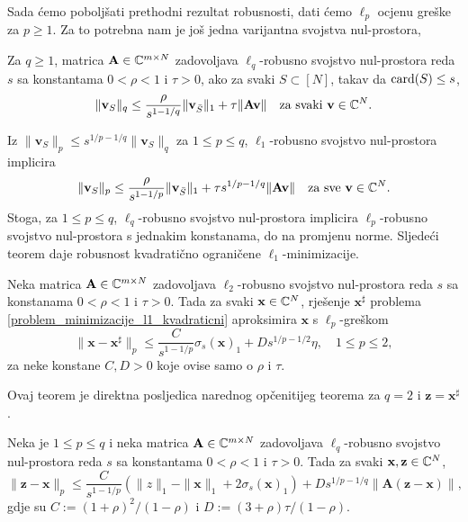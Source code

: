\documentclass[a4paper,twoside,12pt]{memoir} %
\newcommand{\vect}[1]{\mathbf{#1}}
\renewcommand{\vec}{\vect}
\newcommand{\card}{\text{\normalfont{card}}}
\newcommand{\norm}[1]{\|{#1}\|}
\begin{document}
Sada \'cemo pobolj\v{s}ati prethodni rezultat robusnosti, dati \'cemo $\ell_p$ ocjenu gre\v{s}ke za $p \geq 1$. Za to potrebna nam je jo\v{s} jedna varijantna svojstva nul-prostora,
\begin{defn}
    Za $q \geq 1$, matrica $\vec A \in \C^{m \times N}$ zadovoljava $\ell_q$-robusno svojstvo nul-prostora reda $s$ sa konstantama $0 < \rho < 1$ i $\tau > 0$, ako za svaki $S \subset [N]$, takav da $\card(S) \leq s$,
    \begin{equation*}
        \norm{\vec v_S}_q \leq \frac{\rho}{s^{1-1/q}}\norm{\vec v_{\bar S}}_1 + \tau \norm{\vec{Av}}\quad \text{za svaki }\vec{v} \in \C^N.
    \end{equation*}
\end{defn}
\noindent Iz $\norm{\vec v_S}_p \leq s^{1/p - 1/q}\norm{\vec v_S}_q$ za $1 \leq p \leq q$, $\ell_1$-robusno svojstvo nul-prostora implicira
\begin{equation*}
    \norm{\vec v_S}_p \leq \frac{\rho}{s^{1-1/p}}\norm{\vec v_{\bar S}}_1 + \tau s^{1/p-1/q}\norm{\vec{Av}} \quad \text{za sve } \vec v \in \C^N.
\end{equation*}
Stoga, za $1 \leq p \leq q$, $\ell_q$-robusno svojstvo nul-prostora implicira $\ell_p$-robusno svojstvo nul-prostora s jednakim konstanama, do na promjenu norme. Sljede\'ci teorem daje robusnost kvadrati\v{c}no ograni\v{c}ene $\ell_1$-minimizacije.
\begin{thm}\label{robusnost_l1_min_kvad_ogr}
    Neka matrica $\vec A \in \C^{m \times N}$  zadovoljava $\ell_2$-robusno svojstvo nul-prostora reda $s$ sa konstanama $0<\rho<1$ i $\tau >0$. Tada za svaki $\vec x \in \C^N$, rje\v{s}enje $\vec x^{\sharp}$ problema \eqref{problem_minimizacije_l1_kvadraticni} aproksimira $\vec x$ s $\ell_p$-gre\v{s}kom
    \begin{equation}
        \norm{\vec x - \vec x^{\sharp}}_p \leq \frac{C}{s^{1-1/p}} \sigma_s(\vec x)_1 + D s^{1/p - 1/2} \eta, \quad 1 \leq p \leq 2,
    \end{equation}
    za neke konstane $C,D > 0$ koje ovise samo o $\rho$ i $\tau$.
\end{thm}
Ovaj teorem je direktna posljedica narednog op\v{c}enitijeg teorema za $q = 2$ i $\vec z = \vec x^{\sharp}$.
\begin{thm}
    Neka je $1 \leq p \leq q$ i neka matrica $\vec A \in \C^{m \times N}$ zadovoljava $\ell_q$-robusno svojstvo nul-prostora reda $s$ sa konstantama $0 < \rho < 1$ i $\tau > 0$. Tada za svaki $\vec x, \vec z \in \C^N$,
    \begin{equation*}
        \norm{\vec z - \vec x}_p \leq \frac{C}{s^{1-1/p}}(\norm{z}_1 - \norm{\vec x}_1 + 2 \sigma_s(\vec x)_1) + D s^{1/p-1/q} \norm{\vec A (\vec z - \vec x)},
    \end{equation*}
    gdje su $C:=(1+\rho)^2/(1-\rho)$ i $D:=(3+\rho)\tau/(1-\rho)$.
\end{thm}
\end{document}
